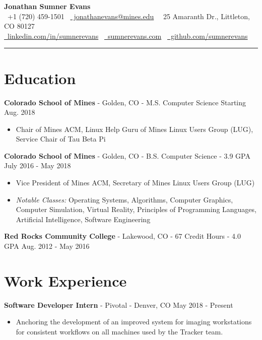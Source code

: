 \documentclass[10pt,letterpaper]{article}
\begin{document}
\begin{center}
    {\huge\textbf{Jonathan Sumner Evans}} \\
    \vspace{3pt}
    \faPhone\ +1 (720) 459-1501
    \textbar\ \href{mailto:jonathanevans@mines.edu}{\faEnvelope\ jonathanevans@mines.edu}
    \textbar\ \faHome\ 25 Amaranth Dr., Littleton, CO 80127 \\
    \href{https://www.linkedin.com/in/sumnerevans}{\faLinkedin\
    linkedin.com/in/sumnerevans}
    \textbar\ \href{http://sumnerevans.com}{\faGlobe\ sumnerevans.com}
    \textbar\ \href{https://github.com/sumnerevans}{\faGithub\
    github.com/sumnerevans}
    \rule{\textwidth}{0.5pt}
\end{center}

\section*{Education}
\textbf{Colorado School of Mines} - Golden, CO - M.S. Computer Science
\hfill Starting Aug. 2018
\begin{itemize}
    \item Chair of Mines ACM, Linux Help Guru of Mines Linux Users Group (LUG),
        Service Chair of Tau Beta Pi
\end{itemize}

\textbf{Colorado School of Mines} - Golden, CO - B.S. Computer Science - 3.9 GPA
\hfill July 2016 - May 2018
\begin{itemize}
    \item Vice President of Mines ACM, Secretary of Mines Linux Users Group
        (LUG)
    \item \textit{Notable Classes:} Operating Systems, Algorithms, Computer
        Graphics, Computer Simulation, Virtual Reality, Principles of
        Programming Languages, Artificial Intelligence, Software Engineering
\end{itemize}

\vspace{2pt}
\textbf{Red Rocks Community College} - Lakewood, CO - 67 Credit Hours - 4.0 GPA
\hfill Aug. 2012 - May 2016

\section*{Work Experience}
\textbf{Software Developer Intern} - Pivotal - Denver, CO
\hfill May 2018 - Present
\begin{itemize}
    \item Anchoring the development of an improved system for imaging
        workstations for consistent workflows on all machines used by the
        Tracker team.
\end{itemize}
\end{document}
